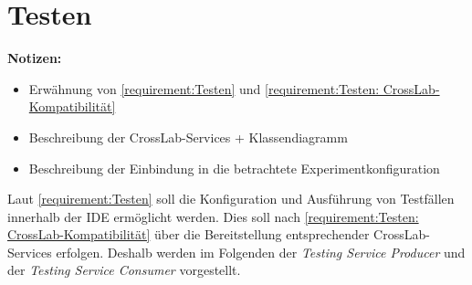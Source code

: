\section{Testen}\label{section:konzeption:testen}

\begin{note}
    \textbf{Notizen:}
    \begin{itemize}
        \item Erwähnung von \autoref{requirement:Testen} und \autoref{requirement:Testen: CrossLab-Kompatibilität}
        \item Beschreibung der CrossLab-Services + Klassendiagramm
        \item Beschreibung der Einbindung in die betrachtete Experimentkonfiguration
    \end{itemize}
\end{note}

Laut \autoref{requirement:Testen} soll die Konfiguration und Ausführung von Testfällen innerhalb der IDE ermöglicht werden. Dies soll nach \autoref{requirement:Testen: CrossLab-Kompatibilität} über die Bereitstellung entsprechender CrossLab-Services erfolgen. Deshalb werden im Folgenden der \textit{Testing Service Producer} und der \textit{Testing Service Consumer} vorgestellt.


